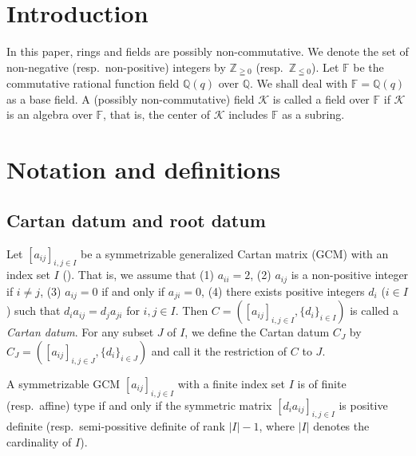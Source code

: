 \documentclass[12pt,a4paper]{article}
\newcommand\K{{\mathcal K}}
\newcommand\Z{{\mathbb Z}} %
\newcommand\F{{\mathbb F}} %
\newcommand\Q{{\mathbb Q}} %
\theoremstyle{plain} %
\theoremstyle{definition} %
\theoremstyle{definition} %
\numberwithin{theorem}{section}
\numberwithin{equation}{section}
\numberwithin{figure}{section}
\numberwithin{table}{section}
\begin{document}
\title{\TITLE}
\author{\AUTHOR}
\date{\DATE}
\maketitle
\begin{abstract}\ABSTRACT\end{abstract}
\tableofcontents
\setcounter{section}{-1} %

\section{Introduction}

In this paper, rings and fields are possibly non-commutative.
We denote the set of non-negative (resp.\ non-positive) integers 
by $\Z_{\geqq0}$ (resp.\ $\Z_{\leqq0}$).
%
Let $\F$ be the commutative rational function field $\Q(q)$ over $\Q$.
We shall deal with $\F=\Q(q)$ as a base field.
A (possibly non-commutative) field $\K$ is called a field over $\F$
if $\K$ is an algebra over $\F$, 
that is, the center of $\K$ includes $\F$ as a subring.


\section{Notation and definitions}

\subsection{Cartan datum and root datum}

Let $[a_{ij}]_{i,j\in I}$ be a 
symmetrizable generalized Cartan matrix (GCM)
with an index set $I$ (\cite{kac-book}).
That is, we assume that 
(1) $a_{ii}=2$, 
(2) $a_{ij}$ is a non-positive integer if $i\ne j$,
(3) $a_{ij}=0$ if and only if $a_{ji}=0$, 
(4) there exists positive integers $d_i$ ($i\in I$) 
such that $d_ia_{ij}=d_ja_{ji}$ for $i,j\in I$.
Then $C=([a_{ij}]_{i,j\in I}, \{d_i\}_{i\in I})$ is called
a {\em Cartan datum}.
For any subset $J$ of $I$, 
we define the Cartan datum $C_J$ by $C_J=([a_{ij}]_{i,j\in J}, \{d_i\}_{i\in J})$
and call it the restriction of $C$ to $J$.

A symmetrizable GCM $[a_{ij}]_{i,j\in I}$ with a finite index set $I$
is of finite (resp.\ affine) type 
if and only if the symmetric matrix $[d_ia_{ij}]_{i,j\in I}$ is 
positive definite (resp.\ semi-possitive definite of rank $|I|-1$,
where $|I|$ denotes the cardinality of $I$).
\end{document}
